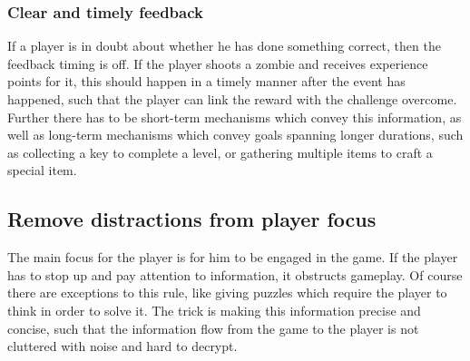 \subsubsection{Clear and timely feedback}
If a player is in doubt about whether he has done something correct, then the feedback timing is off.
If the player shoots a zombie and receives experience points for it, this should happen in a timely manner after the event has happened, such that the player can link the reward with the challenge overcome.
Further there has to be short-term mechanisms which convey this information, as well as long-term mechanisms which convey goals spanning longer durations,
such as collecting a key to complete a level, or gathering multiple items to craft a special item.

\subsection{Remove distractions from player focus}
The main focus for the player is for him to be engaged in the game.
If the player has to stop up and pay attention to information, it obstructs gameplay.
Of course there are exceptions to this rule, like giving puzzles which require the player to think in order to solve it.
The trick is making this information precise and concise, such that the information flow from the game to the player is not cluttered with noise and hard to decrypt.
